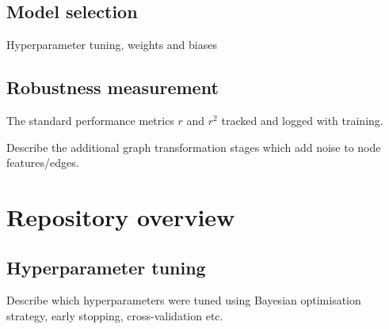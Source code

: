 \subsection{Model selection}
Hyperparameter tuning, weights and biases

\subsection{Robustness measurement}


The standard performance metrics $r$ and $r^2$ tracked and logged with training.

Describe the additional graph transformation stages which add noise to node features/edges.


\section{Repository overview}


\newpage

\subsection{Hyperparameter tuning}
Describe which hyperparameters were tuned using Bayesian optimisation strategy, early stopping, cross-validation etc.




